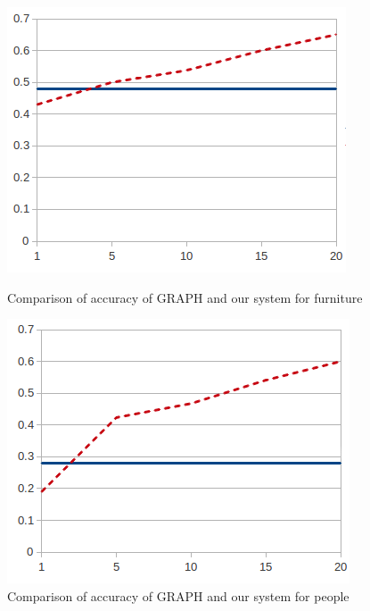 \begin{figure}[ht]
\begin{minipage}{0.50\linewidth}
\centering
\includegraphics[width=\textwidth]{images/furniturePrec.png}
\caption{Comparison of accuracy of GRAPH and our system for furniture}
\label{graficoPresicionFurniture}
\end{minipage}
\begin{minipage}{0.50\linewidth}
\centering
\includegraphics[width=\textwidth]{images/precP.png}
\caption{Comparison of accuracy of GRAPH and our system for people}
\label{graficoPresicionPeople}
\end{minipage}
\end{figure}

